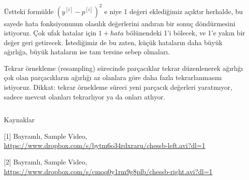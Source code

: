 \documentclass[12pt,fleqn]{article}\usepackage{../../common}
\begin{document}
Üstteki formülde $(y^{[i]} - p^{[i]})^2$ e niye 1 değeri eklediğimiz açıktır
herhalde, bu sayede hata fonksiyonunun olasılık değerlerini andıran bir sonuç
döndürmesini istiyoruz. Çok ufak hatalar için $1 + hata$ bölünendeki 1'i
bölecek, ve 1'e yakın bir değer geri getirecek. İstediğimiz de bu zaten, küçük
hataların daha büyük ağırlığa, büyük hataların ise tam tersine sebep olmaları.

Tekrar örnekleme (resampling) sürecinde parçacıklar tekrar düzenlenerek ağırlığı
çok olan parçacıkların ağırlığı az olanlara göre daha fazla tekrarlanmasını
istiyoruz. Dikkat: tekrar örnekleme süreci yeni parçacık değerleri yaratmıyor,
sadece mevcut olanları tekrarlıyor ya da onları atlıyor.

\inputminted[fontsize=\footnotesize]{python}{track-chess-pf.py}

Kaynaklar

[1] Bayramlı, Sample Video, \url{https://www.dropbox.com/s/bytm6o34rdxraru/chessb-left.avi?dl=1}

[2] Bayramlı, Sample Video, \url{https://www.dropbox.com/s/cmoq0y1rm9g8plb/chessb-right.avi?dl=1}
\end{document}

